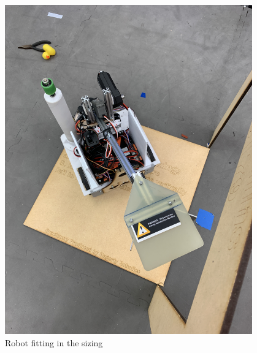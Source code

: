 \begin{figure}[ht]
\begin{minipage}[b]{.48\textwidth}
  \includegraphics[width=0.95\textwidth]{Meetings/November/11-08-21/11-8-21_Hardware_Figure4 - Nathan Forrer.JPG}
  \caption{Robot fitting in the sizing}
  \label{fig:pic4}
\end{minipage}
\end{figure}



